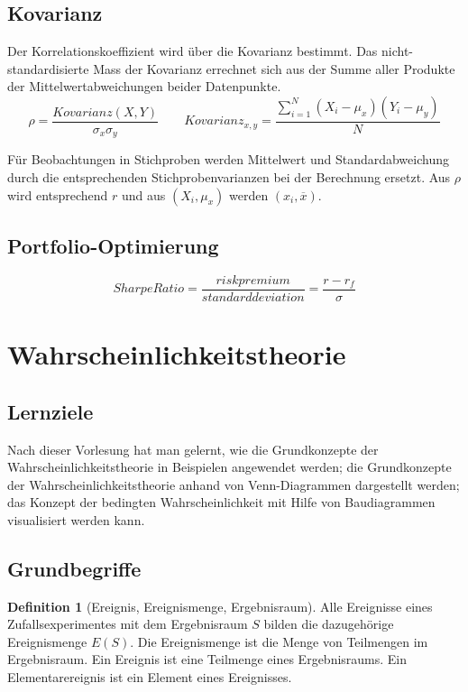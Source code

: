 \documentclass{article}
\theoremstyle{definition}
\newtheorem{definition}{Definition}
\theoremstyle{exercise}
\theoremstyle{solution}
\theoremstyle{lemma}
\begin{document}
\subsection{Kovarianz}
Der Korrelationskoeffizient wird über die Kovarianz bestimmt. Das nicht-standardisierte Mass der Kovarianz errechnet sich aus der Summe aller Produkte der Mittelwertabweichungen beider Datenpunkte.
\[ \rho=\frac{Kovarianz(X,Y)}{\sigma_x\sigma_y} \qquad Kovarianz_{x,y}=\frac{\sum_{i=1}^N(X_i-\mu_x)(Y_i-\mu_y)}{N} \]

Für Beobachtungen in Stichproben werden Mittelwert und Standardabweichung durch die entsprechenden Stichprobenvarianzen bei der Berechnung ersetzt. Aus \(\rho\) wird entsprechend \(r\) und aus \((X_i,\mu_x)\) werden \((x_i,\overline{x})\).

\subsection{Portfolio-Optimierung}

\[ Sharpe Ratio = \frac{risk premium}{standard deviation}=\frac{r-r_f}{\sigma} \]


\section{Wahrscheinlichkeitstheorie}
\subsection{Lernziele}
Nach dieser Vorlesung hat man gelernt, wie die Grundkonzepte der Wahrscheinlichkeitstheorie in Beispielen angewendet werden; die Grundkonzepte der Wahrscheinlichkeitstheorie anhand von Venn-Diagrammen dargestellt werden; das Konzept der bedingten Wahrscheinlichkeit mit Hilfe von Baudiagrammen visualisiert werden kann.

\subsection{Grundbegriffe}

\begin{definition}[Ereignis, Ereignismenge, Ergebnisraum]
Alle Ereignisse eines Zufallsexperimentes mit dem Ergebnisraum \(S\) bilden die dazugehörige Ereignismenge \(E(S)\). Die Ereignismenge ist die Menge von Teilmengen im Ergebnisraum. Ein Ereignis ist eine Teilmenge eines Ergebnisraums. Ein Elementarereignis ist ein Element eines Ereignisses.
\end{definition}
\end{document}
